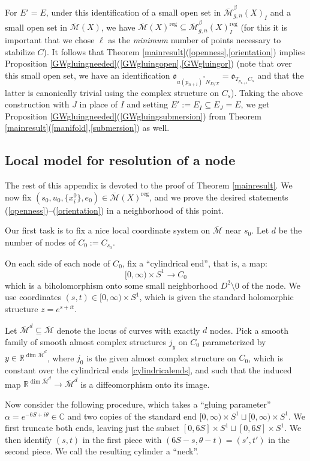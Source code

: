 \documentclass[12pt]{article}
\theoremstyle{definition}
\theoremstyle{remark}
\numberwithin{equation}{subsection}
\newcommand{\oo}{\mathfrak o}
\newcommand{\CC}{\mathbb C}
\newcommand{\RR}{\mathbb R}
\newcommand{\Mbar}{\overline{\mathcal M}}
\newcommand{\reg}{\mathrm{reg}}
\begin{document}
For $E'=E$, under this identification of a small open set in $\Mbar^\beta_{g,n}(X)_I$ and a small open set in $\Mbar(X)$, we have $\Mbar(X)^\reg\subseteq\Mbar^\beta_{g,n}(X)_I^\reg$ (for this it is important that we chose $\ell$ as the \emph{minimum} number of points necessary to stabilize $C$).  It follows that Theorem \ref{mainresult}(\ref{openness},\ref{orientation}) implies Proposition \ref{GWgluingneeded}(\ref{GWgluingopen},\ref{GWgluingor}) (note that over this small open set, we have an identification $\oo_{u(p_{n+i})^\ast N_{D/X}}=\oo_{T_{p_{n+i}}C_s}$ and that the latter is canonically trivial using the complex structure on $C_s$).  Taking the above construction with $J$ in place of $I$ and setting $E':=E_I\subseteq E_J=E$, we get Proposition \ref{GWgluingneeded}(\ref{GWgluingsubmersion}) from Theorem \ref{mainresult}(\ref{manifold},\ref{submersion}) as well.

\subsection{Local model for resolution of a node}

The rest of this appendix is devoted to the proof of Theorem \ref{mainresult}.  We now fix $(s_0,u_0,\{x_i^0\},e_0)\in\Mbar(X)^\reg$, and we prove the desired statements (\ref{openness})--(\ref{orientation}) in a neighborhood of this point.

Our first task is to fix a nice local coordinate system on $\Mbar$ near $s_0$.  Let $d$ be the number of nodes of $C_0:=C_{s_0}$.

On each side of each node of $C_0$, fix a ``cylindrical end'', that is, a map:
\begin{equation}\label{cylindricalends}
[0,\infty)\times S^1\to C_0
\end{equation}
which is a biholomorphism onto some small neighborhood $D^2\setminus 0$ of the node.  We use coordinates $(s,t)\in[0,\infty)\times S^1$, which is given the standard holomorphic structure $z=e^{s+it}$.

Let $\Mbar^d\subseteq\Mbar$ denote the locus of curves with exactly $d$ nodes.  Pick a smooth family of smooth almost complex structures $j_y$ on $C_0$ parameterized by $y\in\RR^{\dim\Mbar^d}$, where $j_0$ is the given almost complex structure on $C_0$, which is constant over the cylindrical ends \eqref{cylindricalends}, and such that the induced map $\RR^{\dim\Mbar^d}\to\Mbar^d$ is a diffeomorphism onto its image.

Now consider the following procedure, which takes a ``gluing parameter'' $\alpha=e^{-6S+i\theta}\in\CC$ and two copies of the standard end $[0,\infty)\times S^1\sqcup[0,\infty)\times S^1$.  We first truncate both ends, leaving just the subset $[0,6S]\times S^1\sqcup[0,6S]\times S^1$.  We then identify $(s,t)$ in the first piece with $(6S-s,\theta-t)=(s',t')$ in the second piece.  We call the resulting cylinder a ``neck''.
\end{document}
